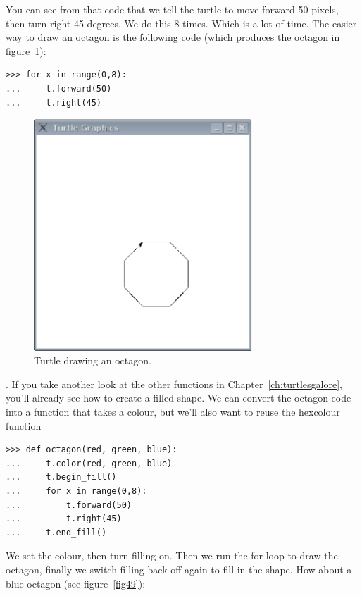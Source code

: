 \noindent
You can see from that code that we tell the turtle to move forward 50 pixels, then turn right 45 degrees.  We do this 8 times.  Which is a lot of time.  The easier way to draw an octagon is the following code (which produces the octagon in figure~\ref{fig48}):

\begin{listing}
\begin{verbatim}
>>> for x in range(0,8):
...     t.forward(50)
...     t.right(45)
\end{verbatim}
\end{listing}

\begin{figure}
\begin{center}
\includegraphics[width=82mm]{eps/figure48.eps}
\end{center}
\caption{Turtle drawing an octagon.}\label{fig48}
\end{figure}

.  If you take another look at the other functions in Chapter~\ref{ch:turtlesgalore}, you'll already see how to create a filled shape. We can convert the octagon code into a function that takes a colour, but we'll also want to reuse the hexcolour function 

\begin{listing}
\begin{verbatim}
>>> def octagon(red, green, blue):
...     t.color(red, green, blue)
...     t.begin_fill()
...     for x in range(0,8):
...         t.forward(50)
...         t.right(45)
...     t.end_fill()
\end{verbatim}
\end{listing}

We set the colour, then turn filling on.  Then we run the for loop to draw the octagon, finally we switch filling back off again to fill in the shape. How about a blue octagon (see figure~\ref{fig49}):

